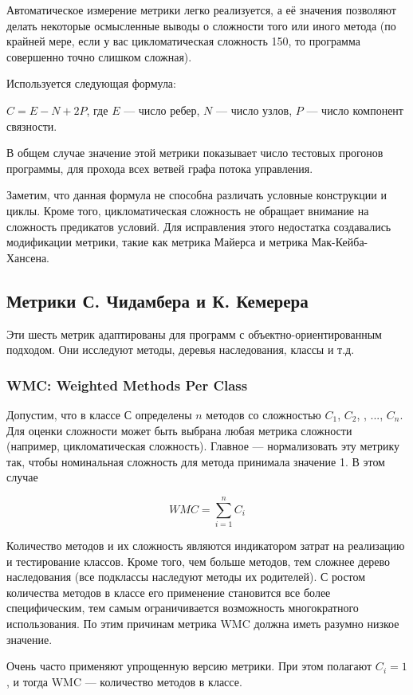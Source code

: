 \documentclass{../../text-style}
\begin{document}
Автоматическое измерение метрики легко реализуется, а её значения позволяют делать некоторые осмысленные выводы о сложности того или иного метода (по крайней мере, если у вас цикломатическая сложность 150, то программа совершенно точно слишком сложная).

Используется следующая формула:

$C = E - N + 2P$, где $E$ --- число ребер, $N$ --- число узлов, $P$ --- число компонент связности.

В общем случае значение этой метрики показывает число тестовых прогонов программы, для прохода всех ветвей графа потока управления.

Заметим, что данная формула не способна различать условные конструкции и циклы. Кроме того, цикломатическая сложность не обращает внимание на сложность предикатов условий. Для исправления этого недостатка создавались модификации метрики, такие как метрика Майерса и метрика Мак-Кейба-Хансена.

\subsection{Метрики С. Чидамбера и К. Кемерера}

Эти шесть метрик адаптированы для программ с объектно-ориентированным подходом. Они исследуют методы, деревья наследования, классы и т.д.

\subsubsection{WMC: Weighted Methods Per Class}
Допустим, что в классе $С$ определены $n$ методов со сложностью $C_1$, $C_2$, , ..., $C_n$. Для оценки сложности может быть выбрана любая метрика сложности (например, цикломатическая сложность). Главное --- нормализовать эту метрику так, чтобы номинальная сложность для метода принимала значение 1. В этом случае

$$WMC = \sum_{i=1}^{n}C_i$$

Количество методов и их сложность являются индикатором затрат на реализацию и тестирование классов. Кроме того, чем больше методов, тем сложнее дерево наследования (все подклассы наследуют методы их родителей). С ростом количества методов в классе его применение становится все более специфическим, тем самым ограничивается возможность многократного использования. По этим причинам метрика WMC должна иметь разумно низкое значение.

Очень часто применяют упрощенную версию метрики. При этом полагают $C_i = 1$, и тогда WMC --- количество методов в классе.
\end{document}
